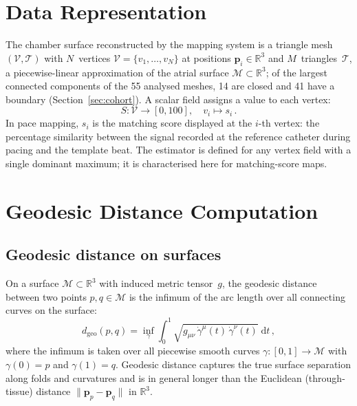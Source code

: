 \documentclass[a4paper,fleqn]{cas-dc}
\begin{document}
\section{Data Representation}\label{sec:data}

The chamber surface reconstructed by the mapping system is a triangle
mesh $(\mathcal{V}, \mathcal{T})$ with $N$~vertices
$\mathcal{V} = \{v_1, \ldots, v_N\}$ at positions
$\mathbf{p}_i \in \mathbb{R}^3$ and $M$~triangles~$\mathcal{T}$, a
piecewise-linear approximation of the atrial surface
$\mathcal{M} \subset \mathbb{R}^3$\label{sec:mesh}; of the largest
connected components of the 55 analysed meshes, 14 are closed and 41
have a boundary (Section~\ref{sec:cohort}).  A scalar field assigns a
value to each vertex\label{sec:scalar}:
\begin{equation}
  S \colon \mathcal{V} \to [0, 100], \quad v_i \mapsto s_i\,.
  \label{eq:scalar}
\end{equation}
In pace mapping, $s_i$ is the matching score displayed at the $i$-th
vertex: the percentage similarity between the signal recorded at the
reference catheter during pacing and the template beat.  The estimator
is defined for any vertex field with a single
dominant maximum; it is characterised here for matching-score maps.

\section{Geodesic Distance Computation}\label{sec:geodesic}

\subsection{Geodesic distance on surfaces}\label{sec:geodesic_def}

On a surface $\mathcal{M} \subset \mathbb{R}^3$ with induced metric
tensor~$g$, the geodesic distance between two points $p, q \in
\mathcal{M}$ is the infimum of the arc length over all connecting curves
on the surface:
\begin{equation}
  d_{\mathrm{geo}}(p, q) = \inf_{\gamma}
    \int_0^1 \!\sqrt{g_{\mu\nu}\,\dot{\gamma}^\mu(t)\,
    \dot{\gamma}^\nu(t)}\;\mathrm{d}t\,,
  \label{eq:geodesic}
\end{equation}
where the infimum is taken over all piecewise smooth curves
$\gamma\colon [0,1] \to \mathcal{M}$ with $\gamma(0)=p$ and
$\gamma(1)=q$.  Geodesic distance captures the true surface separation
along folds and curvatures and is in general longer than the Euclidean
(through-tissue) distance $\|\mathbf{p}_p - \mathbf{p}_q\|$ in
$\mathbb{R}^3$.
\end{document}
